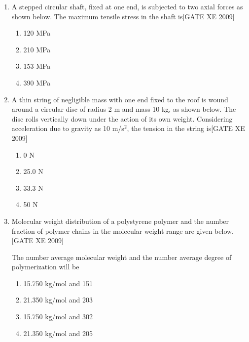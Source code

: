 \documentclass[journal,12pt,onecolumn]{IEEEtran}
\theoremstyle{remark}
\begin{document}
\begin{enumerate}
\item A stepped circular shaft, fixed at one end, is subjected to two axial forces as shown below. The maximum tensile stress in the shaft is\hfill[GATE XE 2009]

\begin{multicols}{2}
\begin{enumerate}
    \item 120 MPa
    \item 210 MPa
    \item 153 MPa
    \item 390 MPa
\end{enumerate}
\end{multicols}



\item A thin string of negligible mass with one end fixed to the roof is wound around a circular disc of radius 2 m and mass 10 kg, as shown below. The disc rolls vertically down under the action of its own weight. Considering acceleration due to gravity as 10 m/s$^2$, the tension in the string is\hfill[GATE XE 2009]

\begin{multicols}{2}
\begin{enumerate}
    \item 0 N
    \item 25.0 N
    \item 33.3 N
    \item 50 N
\end{enumerate}
\end{multicols}

\item {Molecular weight distribution of a polystyrene polymer and the number fraction of polymer chains in the molecular weight range are given below.}\hfill[GATE XE 2009]





The number average molecular weight and the number average degree of polymerization will be

\begin{enumerate}
    

    \item 15.750 kg/mol and 151
    \item 21.350 kg/mol and 203
    \item15.750 kg/mol and 302
    \item 21.350 kg/mol and 205
\end{enumerate}



\end{enumerate}
\end{document}
